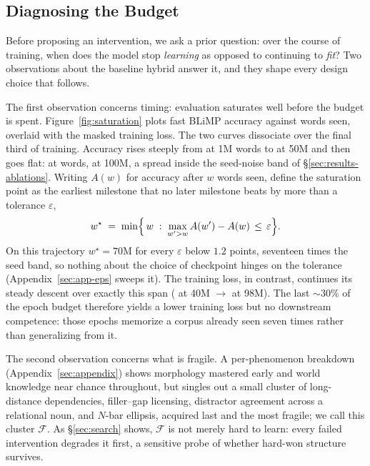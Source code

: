 \subsection{Diagnosing the Budget}
\label{sec:diagnosis}
Before proposing an intervention, we ask a prior question: over the course
of training, when does the model stop \emph{learning} as opposed to
continuing to \emph{fit}? Two observations about the baseline hybrid
answer it, and they shape every design choice that follows.

The first observation concerns timing: evaluation saturates well before the
budget is spent. Figure~\ref{fig:saturation} plots fast BLiMP accuracy against words seen,
overlaid with the masked training loss. The two curves dissociate
over the final third of training. Accuracy rises steeply from \rBlimpOneM{} at
1M words to \rBlimpFiftyM{} at 50M and then goes flat: \rBlimpPeak{} at
\rPeakCkpt{} words, \rBlimpFinal{} at 100M, a spread inside the seed-noise
band of \S\ref{sec:results-ablations}. Writing $A(w)$ for accuracy after
$w$ words seen, define the saturation point as the earliest milestone that
no later milestone beats by more than a tolerance $\varepsilon$,
\begin{equation}
\label{eq:wstar}
w^{\star} \;=\; \min\Bigl\{\, w \;:\; \max_{w' > w} A(w') - A(w) \,\le\, \varepsilon \Bigr\}.
\end{equation}
On this trajectory $w^{\star}=\text{70M}$ for every $\varepsilon$ below
$1.2$ points, seventeen times the seed band, so nothing about the choice
of checkpoint hinges on the tolerance
(Appendix~\ref{sec:app-eps} sweeps it). The training loss, in contrast, continues its steady descent over
exactly this span (\rLossForty{} at 40M
$\rightarrow$ \rLossFinal{} at 98M). The last $\sim\!30\%$ of the epoch budget
therefore yields a lower training loss but no downstream competence:
those epochs memorize a corpus already seen seven times rather than
generalizing from it.

The second observation concerns what is fragile. A per-phenomenon
breakdown (Appendix~\ref{sec:appendix}) shows morphology mastered early and
world knowledge near chance throughout, but singles out a small cluster of
long-distance dependencies, filler--gap licensing, distractor agreement
across a relational noun, and $N$-bar ellipsis, acquired last and
the most fragile; we call this cluster $\mathcal{F}$. As
\S\ref{sec:search} shows, $\mathcal{F}$ is not merely hard to learn:
every failed intervention degrades it first, a sensitive probe of
whether hard-won structure survives.

